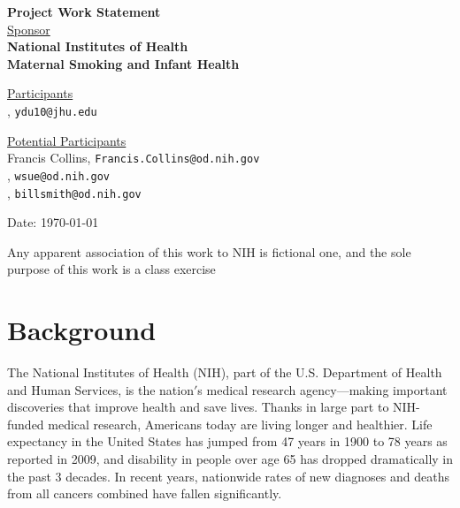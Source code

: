 \documentclass[12pt,letterpaper]{article}
\theoremstyle{definition}
\begin{document}
\def\shiftdowna{0.32in}  %
\def\shiftdownb{0.22in}  %


\begin{center}
\textbf{{\large Project Work Statement}}\\


\vspace \shiftdowna
\underline {Sponsor}\\ 
\vspace{5pt}
\textbf{{\large National Institutes of Health }}\\

\vspace \shiftdowna
\textbf{{\large Maternal Smoking and Infant Health}}


\vspace{0.35in}
\vspace \shiftdownb
\underline {Participants} \\
\vspace{5pt}
, \texttt{ydu10@jhu.edu}

\vspace \shiftdownb
\underline {Potential Participants}\\
\vspace{5pt}
Francis Collins, \texttt{Francis.Collins@od.nih.gov} \\
\vspace{3pt}
, \texttt{wsue@od.nih.gov} \\
\vspace{3pt}
, \texttt{billsmith@od.nih.gov}

\vspace \shiftdowna
Date: \today

\end{center}

\vfill  
\footnoterule
\noindent \small{Any apparent association of this work to NIH is
fictional one, and the sole purpose of this work is a class exercise}

\newpage

\section{Background} 
The National Institutes of Health (NIH), part of the U.S. Department of Health and Human Services, is the nation$'$s medical research agency---making important discoveries that improve health and save lives. Thanks in large part to NIH-funded medical research, Americans today are living longer and healthier. Life expectancy in the United States has jumped from 47 years in 1900 to 78 years as reported in 2009, and disability in people over age 65 has dropped dramatically in the past 3 decades. In recent years, nationwide rates of new diagnoses and deaths from all cancers combined have fallen significantly. 
\end{document}
